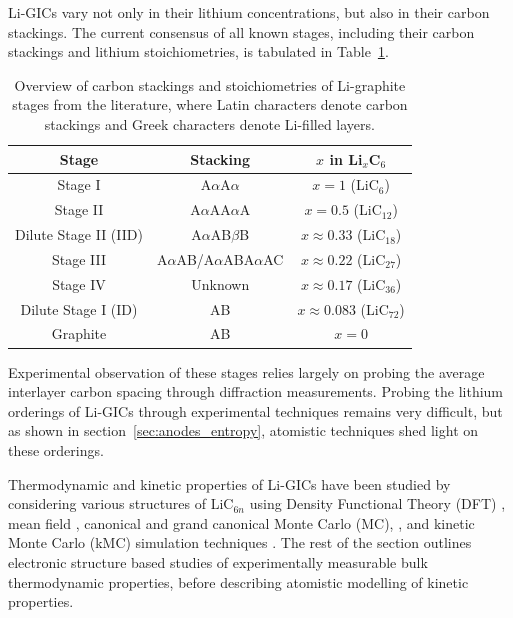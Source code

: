 \documentclass[../main.tex]{subfiles}
\begin{document}
Li-GICs vary not only in their lithium concentrations, but also in their carbon stackings. The current consensus of all known stages, including their carbon stackings and lithium stoichiometries, is tabulated in Table~\ref{table:graphite_stages}.

\begin{table}
    \caption{{Overview of carbon stackings and stoichiometries of Li-graphite stages from the literature, where Latin characters denote carbon stackings and Greek characters denote Li-filled layers. \cite{TRUCANO1975,Okamoto1989,GUERARD1975337,Billaud1996,BILLAUD2002299,Woo1983,Dahn1991,Ohzuku1993,Konar2015,didier2020}}}
    \label{table:graphite_stages}
    \begin{tabular}{|c c c|} 
         \hline
         Stage & Stacking & $x$ in Li$_{x}$C$_{6}$  \\
         \hline
         Stage I & A$\alpha$A$\alpha$ & $x = 1$ (LiC$_{6}$)    \\
         Stage II & A$\alpha$AA$\alpha$A & $x = 0.5$ (LiC$_{12}$)  \\
         Dilute Stage II (IID) & A$\alpha$AB$\beta$B & $x \approx 0.33$ (LiC$_{18}$)   \\
         Stage III & A$\alpha$AB/A$\alpha$ABA$\alpha$AC & $x \approx 0.22$ (LiC$_{27}$) \\
         Stage IV & Unknown & $x \approx 0.17$ (LiC$_{36}$)  \\
         Dilute Stage I (ID) & AB & $x \approx 0.083$ (LiC$_{72}$)  \\
         Graphite & AB & $x = 0$   \\
         \hline
    \end{tabular}
\end{table}

Experimental observation of these stages relies largely on probing the average interlayer carbon spacing through diffraction measurements. Probing the lithium orderings of Li-GICs through experimental techniques remains very difficult,\cite{Zheng1995,Konar2015,Senyshyn2013,Taminato2016,Mercer2019,Mercer2021} but as shown in section~\ref{sec:anodes_entropy}, atomistic techniques shed light on these orderings.

Thermodynamic and kinetic properties of Li-GICs have been studied by considering various structures of LiC$_{6n}$ using Density Functional Theory (DFT) \cite{thinius2014theoretical, Hakim, Qiong, Doreen,JI201866,Wang,persson2010,persson2010lithium,hazrati_li_2014,peng2020lithium,hazrati_li_2014}, mean field \cite{Mercer2019,Leiva2017b,OTERO2017569}, canonical and grand canonical Monte Carlo (MC), \cite{Gavil_n_Arriazu_2018,persson2010,C7CP04253A}, and kinetic Monte Carlo (kMC) simulation techniques \cite{JI201866,persson2010,gavilan-arriazu_effect_2020,gavilan-arriazu_kinetic_2020,GAVILANARRIAZU2018133}. The rest of the section outlines electronic structure based studies of experimentally measurable bulk thermodynamic properties, before describing atomistic modelling of kinetic properties.
\end{document}
